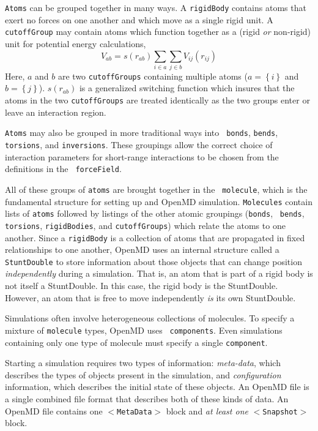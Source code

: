 \documentclass[]{book}
\begin{document}
{\tt Atoms} can be grouped together in many ways.  A {\tt rigidBody}
contains atoms that exert no forces on one another and which move as a
single rigid unit.  A {\tt cutoffGroup} may contain atoms which
function together as a (rigid {\it or} non-rigid) unit for potential
energy calculations,
\begin{equation}
V_{ab} = s(r_{ab}) \sum_{i \in a} \sum_{j \in b} V_{ij}(r_{ij})
\end{equation}
Here, $a$ and $b$ are two {\tt cutoffGroups} containing multiple atoms
($a = \left\{i\right\}$ and $b = \left\{j\right\}$).  $s(r_{ab})$ is a
generalized switching function which insures that the atoms in the two
{\tt cutoffGroups} are treated identically as the two groups enter or
leave an interaction region.

{\tt Atoms} may also be grouped in more traditional ways into {\tt
  bonds}, {\tt bends}, {\tt torsions}, and {\tt inversions}.  These
groupings allow the correct choice of interaction parameters for
short-range interactions to be chosen from the definitions in the {\tt
  forceField}.

All of these groups of {\tt atoms} are brought together in the {\tt
molecule}, which is the fundamental structure for setting up and {\sc
OpenMD} simulation.  {\tt Molecules} contain lists of {\tt atoms}
followed by listings of the other atomic groupings ({\tt bonds}, {\tt
bends}, {\tt torsions}, {\tt rigidBodies}, and {\tt cutoffGroups})
which relate the atoms to one another.  Since a {\tt rigidBody} is a
collection of atoms that are propagated in fixed relationships to one
another, {\sc OpenMD} uses an internal structure called a {\tt
StuntDouble} to store information about those objects that can change
position {\it independently} during a simulation.  That is, an atom
that is part of a rigid body is not itself a StuntDouble.  In this
case, the rigid body is the StuntDouble.  However, an atom that is
free to move independently {\it is} its own StuntDouble.

Simulations often involve heterogeneous collections of molecules.  To
specify a mixture of {\tt molecule} types, {\sc OpenMD} uses {\tt
components}.  Even simulations containing only one type of molecule
must specify a single {\tt component}.

Starting a simulation requires two types of information: {\it
meta-data}, which describes the types of objects present in the
simulation, and {\it configuration} information, which describes the
initial state of these objects.  An {\sc OpenMD} file is a single
combined file format that describes both of these kinds of data.  An
{\sc OpenMD} file contains one {\tt $<$MetaData$>$} block and {\it at least
one} {\tt $<$Snapshot$>$} block.
\end{document}
